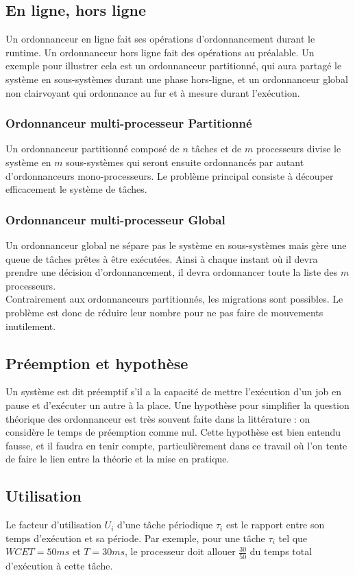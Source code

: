 \documentclass[11pt,a4paper,oneside]{report}
\begin{document}
\subsection{En ligne, hors ligne}
Un ordonnanceur en ligne fait ses opérations d'ordonnancement durant le runtime. 
Un ordonnanceur hors ligne fait des opérations au préalable. 
Un exemple pour illustrer cela est un ordonnanceur partitionné, qui aura partagé le système 
en sous-systèmes durant une phase hors-ligne, et un ordonnanceur global non clairvoyant qui 
ordonnance au fur et à mesure durant l'exécution. 

\subsubsection{Ordonnanceur multi-processeur Partitionné}
Un ordonnanceur partitionné composé de $n$ tâches et de $m$ processeurs divise 
le système en $m$ sous-systèmes qui seront ensuite ordonnancés par autant d'ordonnanceurs 
mono-processeurs. Le problème principal consiste à découper efficacement le système de tâches.

\subsubsection{Ordonnanceur multi-processeur Global}
Un ordonnanceur global ne sépare pas le système en sous-systèmes mais gère une 
queue de tâches prêtes à être exécutées. Ainsi à chaque instant où il devra prendre une décision 
d'ordonnancement, il devra ordonnancer toute la liste des $m$ processeurs.\\
Contrairement aux ordonnanceurs partitionnés, les migrations sont possibles. Le problème 
est donc de réduire leur nombre pour ne pas faire de mouvements inutilement.
	
\subsection{Préemption et hypothèse} 
Un système est dit préemptif s'il a la capacité 
	de mettre l'exécution d'un job en pause et d'exécuter un autre à la place. 
	Une hypothèse pour simplifier la question théorique des ordonnanceur est 
	très souvent faite dans la littérature : on considère le temps de 
	préemption comme nul. Cette hypothèse est bien entendu fausse, et il faudra 
	en tenir compte, particulièrement dans ce travail où l'on tente de faire 
	le lien entre la théorie et la mise en pratique. 

\subsection{Utilisation}
Le facteur d'utilisation $U_i$ d'une tâche périodique $\tau_i$ est le rapport entre 
son temps d'exécution et sa période. Par exemple, pour une tâche $\tau_i$ tel que 
$WCET = 50 ms$ et $T = 30 ms$, le processeur doit allouer $\frac{30}{50}$ du temps 
total d'exécution à cette tâche.\\
\end{document}

